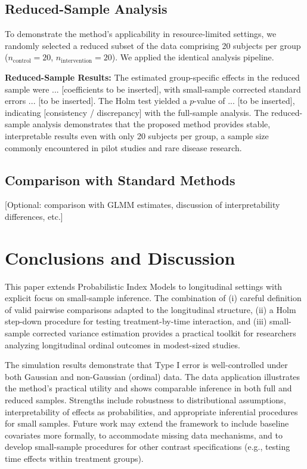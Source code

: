 \documentclass[alpha-refs]{wiley-article}
\begin{document}
\subsection{Reduced-Sample Analysis}

To demonstrate the method's applicability in resource-limited settings, we randomly selected a reduced subset of the data comprising 20 subjects per group ($n_{\text{control}}=20$, $n_{\text{intervention}}=20$). We applied the identical analysis pipeline.

\textbf{Reduced-Sample Results:} The estimated group-specific effects in the reduced sample were ... [coefficients to be inserted], with small-sample corrected standard errors ... [to be inserted]. The Holm test yielded a $p$-value of ... [to be inserted], indicating [consistency / discrepancy] with the full-sample analysis. The reduced-sample analysis demonstrates that the proposed method provides stable, interpretable results even with only 20 subjects per group, a sample size commonly encountered in pilot studies and rare disease research.

\subsection{Comparison with Standard Methods}

[Optional: comparison with GLMM estimates, discussion of interpretability differences, etc.]

\section{Conclusions and Discussion}
\label{conclusion}

This paper extends Probabilistic Index Models to longitudinal settings with explicit focus on small-sample inference. The combination of (i) careful definition of valid pairwise comparisons adapted to the longitudinal structure, (ii) a Holm step-down procedure for testing treatment-by-time interaction, and (iii) small-sample corrected variance estimation provides a practical toolkit for researchers analyzing longitudinal ordinal outcomes in modest-sized studies.

The simulation results demonstrate that Type I error is well-controlled under both Gaussian and non-Gaussian (ordinal) data. The data application illustrates the method's practical utility and shows comparable inference in both full and reduced samples. Strengths include robustness to distributional assumptions, interpretability of effects as probabilities, and appropriate inferential procedures for small samples. Future work may extend the framework to include baseline covariates more formally, to accommodate missing data mechanisms, and to develop small-sample procedures for other contrast specifications (e.g., testing time effects within treatment groups).
\end{document}
